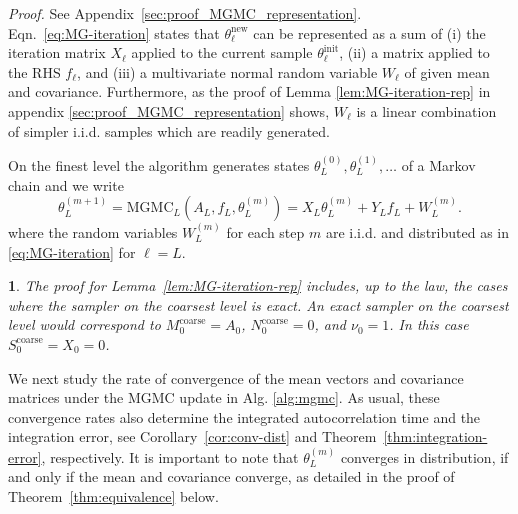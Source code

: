 \documentclass[11pt,english]{article}
\theoremstyle{plain}
\theoremstyle{plain}
\theoremstyle{plain}
\theoremstyle{plain}
\newtheorem{rem}[thm]{\protect\remarkname}
\numberwithin{equation}{section}
\providecommand{\remarkname}{Remark}
\begin{document}
\noindent\textit{Proof.} See Appendix~\ref{sec:proof_MGMC_representation}.\\[1ex]
Eqn.~\eqref{eq:MG-iteration} states that $\theta_{\ell}^{\mathrm{new}}$ can be represented as a sum of (i) the iteration matrix $X_\ell$ applied to the current sample $\theta_{\ell}^{\mathrm{init}}$, (ii) a matrix applied to the RHS $f_{\ell}$, and (iii) a multivariate normal random variable $W_\ell$ of given mean and covariance. Furthermore, as the proof of Lemma \ref{lem:MG-iteration-rep} in appendix \ref{sec:proof_MGMC_representation} shows, $W_\ell$ is a linear combination of simpler i.i.d. samples which are readily generated.

On the finest level the algorithm generates states $\theta_L^{(0)},\theta_L^{(1)},\ldots$ of a Markov chain and we write
\begin{equation}
	\theta_{L}^{(m+1)}=\mathrm{MGMC}_{L}(A_{L},f_{L},\theta_{L}^{(m)}) = X_{L}\theta_{L}^{(m)}+Y_{L}f_{L}+W^{(m)}_{L}.\label{eq:MG-iteration_finest_level}
\end{equation}
where the random variables $W_L^{(m)}$ for each step $m$ are i.i.d. and distributed as in \eqref{eq:MG-iteration} for $\ell=L$.
\begin{rem}\label{rem:exact_coarse_sampler}
	The proof for Lemma~\ref{lem:MG-iteration-rep} includes, up to the law, the cases where the sampler on the coarsest level is exact.
	An exact sampler on the coarsest level would correspond to $M_0^{\mathrm{coarse}} = A_0$,
	$N_0^{\mathrm{coarse}} = 0$, and
	$\nu_0=1$. In this case $S_0^{\mathrm{coarse}}=X_0=0$.
\end{rem}
We next study the rate of convergence of the mean vectors and covariance matrices under the MGMC update in Alg. \ref{alg:mgmc}. As usual, these convergence rates also determine the integrated autocorrelation time and the integration error, see Corollary~\ref{cor:conv-dist} and Theorem~\ref{thm:integration-error}, respectively. It is important to note that $\theta^{(m)}_L$ converges in distribution, if and only if the mean and covariance converge, as detailed in the proof of Theorem~\ref{thm:equivalence} below.
\end{document}
